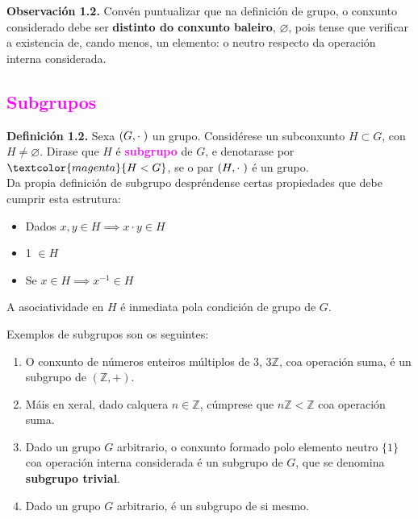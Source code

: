 \documentclass[twoside]{report}
\theoremstyle{mystyle}
\begin{document}
\vspace{7mm}

\noindent \textbf{Observación 1.2.} Convén puntualizar que na definición de grupo, o conxunto considerado debe ser \textbf{distinto do conxunto baleiro}, $\varnothing$, pois tense que verificar a existencia de, cando menos, un elemento: o neutro respecto da operación interna considerada.

\textcolor{magenta}{\subsection{Subgrupos}}

\vspace{5mm}

\noindent \textbf{Definición 1.2.} Sexa $(G, \cdot \hspace{1mm})$ un grupo. Considérese un subconxunto $H \subset G$, con $H \neq \varnothing$. Dirase que $H$ é \textcolor{magenta}{\textbf{subgrupo}} de $G$, e denotarase por $\textcolor{magenta}{H < G}$, se o par $(H, \cdot \hspace{1mm})$ é un grupo.\\

\noindent Da propia definición de subgrupo despréndense certas propiedades que debe cumprir esta estrutura:

\vspace{2mm}

\begin{itemize}
    \item Dados $x,y \in H \implies x \cdot y \in H$
    \item 1 $\in H$
    \item Se $x \in H \implies x^{-1} \in H$
\end{itemize}

\noindent A asociatividade en $H$ é inmediata pola condición de grupo de $G$.

\vspace{3mm}

\noindent Exemplos de subgrupos son os seguintes:

\begin{enumerate}
    \item O conxunto de números enteiros múltiplos de 3, 3$\mathbb{Z}$, coa operación suma, é un subgrupo de $(\mathbb{Z}, +)$.
    \item Máis en xeral, dado calquera $n \in \mathbb{Z}$, cúmprese que $n\mathbb{Z} < \mathbb{Z}$ coa operación suma.
    \item Dado un grupo $G$ arbitrario, o conxunto formado polo elemento neutro $\{1\}$ coa operación interna considerada é un subgrupo de $G$, que se denomina \textbf{subgrupo trivial}.
    \item Dado un grupo $G$ arbitrario, é un subgrupo de si mesmo.
\end{enumerate}
\end{document}
